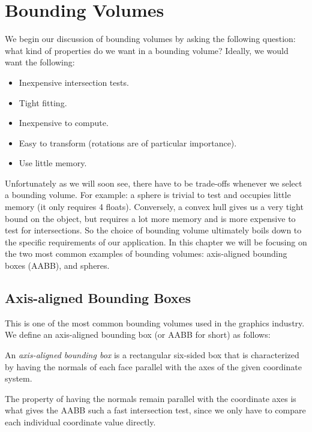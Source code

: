 \chapter{Bounding Volumes}
  We begin our discussion of bounding volumes by asking the following
  question: what kind of properties do we want in a bounding volume?
  Ideally, we would want the following:
  \begin{itemize}
    \item Inexpensive intersection tests.
    \item Tight fitting.
    \item Inexpensive to compute.
    \item Easy to transform (rotations are of particular importance).
    \item Use little memory.
  \end{itemize}

  Unfortunately as we will soon see, there have to be trade-offs whenever we
  select a bounding volume. For example: a sphere is trivial to test and
  occupies little memory (it only requires 4 floats). Conversely, a convex
  hull gives us a very tight bound on the object, but requires a lot more
  memory and is more expensive to test for intersections. So the choice of
  bounding volume ultimately boils down to the specific requirements of our
  application. In this chapter we will be focusing on the two most common
  examples of bounding volumes: axis-aligned bounding boxes (AABB), and
  spheres.

  \section{Axis-aligned Bounding Boxes}
    This is one of the most common bounding volumes used in the graphics
    industry. We define an axis-aligned bounding box (or AABB for short) as
    follows:
    \begin{defn}
      An \emph{axis-aligned bounding box} is a rectangular six-sided box that is
      characterized by having the normals of each face parallel with the axes of
      the given coordinate system.
    \end{defn}

    The property of having the normals remain parallel with the coordinate axes
    is what gives the AABB such a fast intersection test, since we only have to
    compare each individual coordinate value directly.

